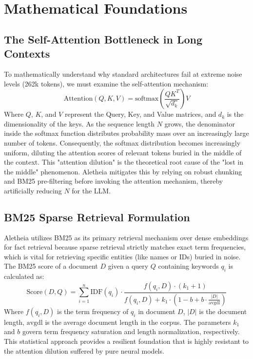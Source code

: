 \documentclass[journal,10pt]{IEEEtran}
\begin{document}
\section{Mathematical Foundations}

\subsection{The Self-Attention Bottleneck in Long Contexts}
To mathematically understand why standard architectures fail at extreme noise levels (262k tokens), we must examine the self-attention mechanism:
\begin{equation}
\text{Attention}(Q, K, V) = \text{softmax}\left(\frac{QK^T}{\sqrt{d_k}}\right)V
\end{equation}
Where $Q$, $K$, and $V$ represent the Query, Key, and Value matrices, and $d_k$ is the dimensionality of the keys. As the sequence length $N$ grows, the denominator inside the softmax function distributes probability mass over an increasingly large number of tokens. Consequently, the softmax distribution becomes increasingly uniform, diluting the attention scores of relevant tokens buried in the middle of the context. This "attention dilution" is the theoretical root cause of the "lost in the middle" phenomenon. Aletheia mitigates this by relying on robust chunking and BM25 pre-filtering before invoking the attention mechanism, thereby artificially reducing $N$ for the LLM.

\subsection{BM25 Sparse Retrieval Formulation}
Aletheia utilizes BM25 as its primary retrieval mechanism over dense embeddings for fact retrieval because sparse retrieval strictly matches exact term frequencies, which is vital for retrieving specific entities (like names or IDs) buried in noise. The BM25 score of a document $D$ given a query $Q$ containing keywords $q_i$ is calculated as:
\begin{equation}
\text{Score}(D, Q) = \sum_{i=1}^{n} \text{IDF}(q_i) \cdot \frac{f(q_i, D) \cdot (k_1 + 1)}{f(q_i, D) + k_1 \cdot \left(1 - b + b \cdot \frac{|D|}{\text{avgdl}}\right)}
\end{equation}
Where $f(q_i, D)$ is the term frequency of $q_i$ in document $D$, $|D|$ is the document length, $\text{avgdl}$ is the average document length in the corpus. The parameters $k_1$ and $b$ govern term frequency saturation and length normalization, respectively. This statistical approach provides a resilient foundation that is highly resistant to the attention dilution suffered by pure neural models.
\end{document}
